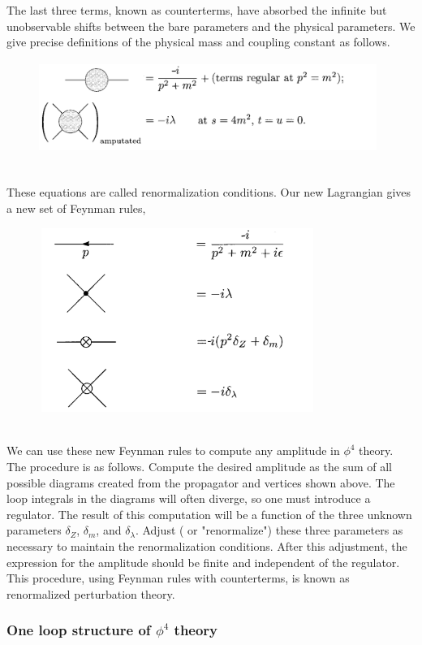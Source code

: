 \documentclass{article}
\begin{document}
The last three terms, known as counterterms, have absorbed the infinite but unobservable shifts between the bare parameters and the physical parameters.
We give precise definitions of the physical mass and coupling constant as follows.
\begin{figure}[!h]
\centering
\includegraphics[height=3cm ,width=11cm]{./pic/RG2.png}
\caption*{}
\end{figure}\\
These equations are called renormalization conditions.
Our new Lagrangian gives a new set of Feynman rules,
\begin{figure}[!h]
\centering
\includegraphics[height=6cm ,width=9cm]{./pic/RG3.png}
\caption*{}
\end{figure}\\
We can use these new Feynman rules to compute any amplitude in $\phi^4$ theory. The procedure is as follows. Compute the desired amplitude as the sum of all possible diagrams created from the propagator and vertices shown above. The loop integrals in the diagrams will often diverge, so one must introduce a regulator. The result of this computation will be a function of the three unknown parameters $\delta_Z$, $\delta_m$, and $\delta_{\lambda}$. Adjust ( or "renormalize") these three parameters as necessary to maintain the renormalization conditions. After this adjustment, the expression for the amplitude should be finite and independent of the regulator. \\
This procedure, using Feynman rules with counterterms, is known as renormalized perturbation theory. 

\subsubsection{One loop structure of $\phi^4$ theory}
\end{document}
